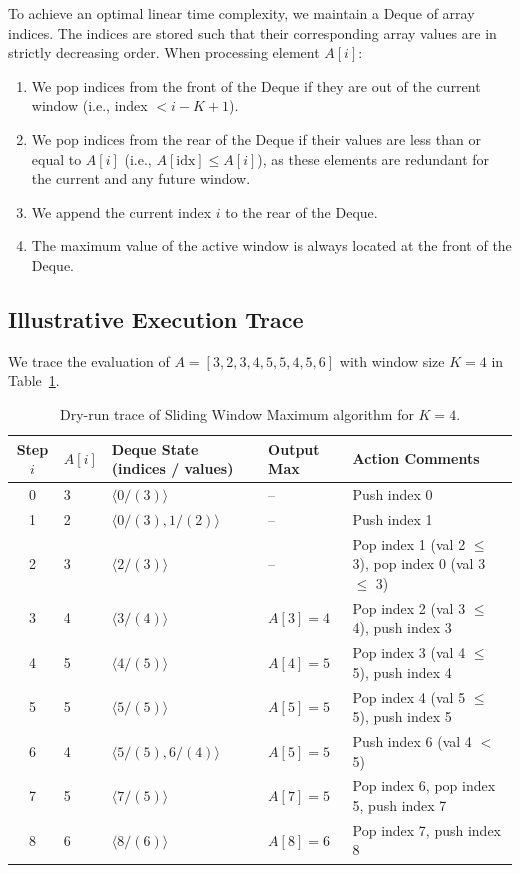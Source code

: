 \documentclass[10pt,journal,compsoc,onecolumn]{IEEEtran}
\begin{document}
To achieve an optimal linear time complexity, we maintain a Deque of array indices. The indices are stored such that their corresponding array values are in strictly decreasing order.
When processing element $A[i]$:
\begin{enumerate}
    \item We pop indices from the front of the Deque if they are out of the current window (i.e., index $< i - K + 1$).
    \item We pop indices from the rear of the Deque if their values are less than or equal to $A[i]$ (i.e., $A[\mathrm{idx}] \le A[i]$), as these elements are redundant for the current and any future window.
    \item We append the current index $i$ to the rear of the Deque.
    \item The maximum value of the active window is always located at the front of the Deque.
\end{enumerate}

\subsection{Illustrative Execution Trace}
We trace the evaluation of $A = [3, 2, 3, 4, 5, 5, 4, 5, 6]$ with window size $K = 4$ in Table~\ref{tab:trace_sliding}.

\begin{table}[htbp]
\centering
\caption{Dry-run trace of Sliding Window Maximum algorithm for $K=4$.}
\label{tab:trace_sliding}
\begin{tabular}{cllll}
\toprule
Step $i$ & $A[i]$ & Deque State (indices / values) & Output Max & Action Comments \\
\midrule
0 & 3 & $\langle 0 / (3) \rangle$ & -- & Push index 0 \\
1 & 2 & $\langle 0/(3), 1/(2) \rangle$ & -- & Push index 1 \\
2 & 3 & $\langle 2 / (3) \rangle$ & -- & Pop index 1 (val 2 $\le$ 3), pop index 0 (val 3 $\le$ 3) \\
3 & 4 & $\langle 3 / (4) \rangle$ & $A[3] = 4$ & Pop index 2 (val 3 $\le$ 4), push index 3 \\
4 & 5 & $\langle 4 / (5) \rangle$ & $A[4] = 5$ & Pop index 3 (val 4 $\le$ 5), push index 4 \\
5 & 5 & $\langle 5 / (5) \rangle$ & $A[5] = 5$ & Pop index 4 (val 5 $\le$ 5), push index 5 \\
6 & 4 & $\langle 5/(5), 6/(4) \rangle$ & $A[5] = 5$ & Push index 6 (val 4 $<$ 5) \\
7 & 5 & $\langle 7 / (5) \rangle$ & $A[7] = 5$ & Pop index 6, pop index 5, push index 7 \\
8 & 6 & $\langle 8 / (6) \rangle$ & $A[8] = 6$ & Pop index 7, push index 8 \\
\bottomrule
\end{tabular}
\end{table}
\end{document}
